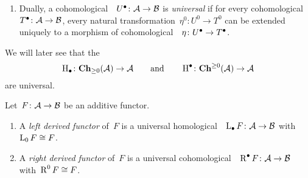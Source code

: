 \begin{definition}
\begin{enumerate}
    \item
      Dually, a cohomological~{\deltafun}~$U^\bullet \colon \mathcal{A} \to \mathcal{B}$ is \emph{universal} if for every cohomological~{\deltafun}~$T^\bullet \colon \mathcal{A} \to \mathcal{B}$, every natural transformation~$\eta^0 \colon U^0 \to T^0$ can be extended uniquely to a morphism of cohomological~{\deltafuns}~$\eta \colon U^\bullet \to T^\bullet$.
  \end{enumerate}
\end{definition}










\begin{example}
  We will later see that the~{\deltafuns}
  \[
            \operatorname{H}_\bullet
    \colon  \mathbf{Ch}_{\geq 0}(\mathcal{A})
    \to     \mathcal{A}
    \qquad\text{and}\qquad
            \operatorname{H}^\bullet
    \colon  \mathbf{Ch}^{\geq 0}(\mathcal{A})
    \to     \mathcal{A}
  \]
  are universal.
\end{example}


\begin{definition}
  Let~$F \colon \mathcal{A} \to \mathcal{B}$ be an additive functor.
  \begin{enumerate}
    \item
      A \emph{left derived functor} of~$F$ is a universal homological~{\deltafun}~$\operatorname{L}_\bullet F \colon \mathcal{A} \to \mathcal{B}$ with~$\operatorname{L}_0 F \cong F$.
    \item
      A \emph{right derived functor} of~$F$ is a universal cohomological~{\deltafun}~$\operatorname{R}^\bullet F \colon \mathcal{A} \to \mathcal{B}$ with~$\operatorname{R}^0 F \cong F$.
  \end{enumerate}
\end{definition}


